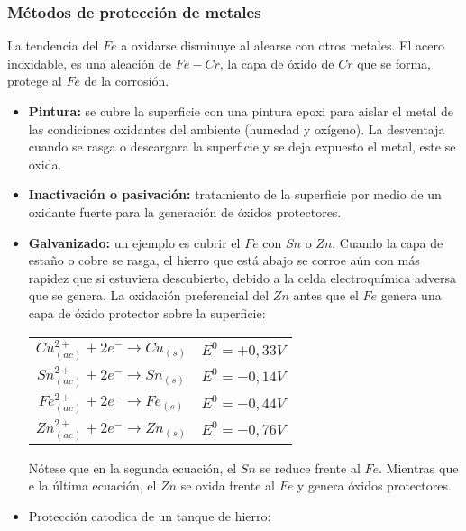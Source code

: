     \subsubsection{Métodos de protección de metales}
    \sangria{} La tendencia del $Fe$ a oxidarse disminuye al alearse con otros metales. El acero inoxidable, es una aleación de $Fe-Cr$, la capa de óxido de $Cr$ que se forma, protege al $Fe$ de la corrosión.
    \saltoPag{}
    \begin{itemize}
        \item \textbf{Pintura:} se cubre la superficie con una pintura epoxi para aislar el metal de las condiciones oxidantes del ambiente (humedad y oxígeno). La desventaja cuando se rasga o descargara la superficie y se deja expuesto el metal, este se oxida.
    \item \textbf{Inactivación o pasivación:} tratamiento de la superficie por medio de un oxidante fuerte para la generación de óxidos protectores.
    \item \textbf{Galvanizado:} un ejemplo es cubrir el $Fe$ con $Sn$ o $Zn$.
        \sangria{} Cuando la capa de estaño o cobre se rasga, el hierro que está abajo se corroe aún con más rapidez que si estuviera descubierto, debido a la celda electroquímica adversa que se genera. La oxidación preferencial del $Zn$ antes que el $Fe$ genera una capa de óxido protector sobre la superficie:
        \begin{center}
        \begin{tabular}{cc}
        \toprule
        \multicolumn{1}{c}{$Cu^{2+}_{(ac)} + 2e^- \rightarrow Cu_{(s)}$} &
        \multicolumn{1}{c}{$E^0 = +0,33V$} \\[5pt]
        \multicolumn{1}{c}{$Sn^{2+}_{(ac)} + 2e^- \rightarrow Sn_{(s)}$} &
        \multicolumn{1}{c}{$E^0 = -0,14V$} \\[5pt]
        \multicolumn{1}{c}{$Fe^{2+}_{(ac)} + 2e^- \rightarrow Fe_{(s)}$} &
        \multicolumn{1}{c}{$E^0 = -0,44V$} \\[5pt]
        \multicolumn{1}{c}{$Zn^{2+}_{(ac)} + 2e^- \rightarrow Zn_{(s)}$} &
        \multicolumn{1}{c}{$E^0 =-0,76V$} \\[5pt] \bottomrule
        \end{tabular}
        \end{center}
        Nótese que en la segunda ecuación, el $Sn$ se reduce frente al $Fe$. Mientras que e la última ecuación, el $Zn$ se oxida frente al $Fe$ y genera óxidos protectores.
    \item Protección catodica de un tanque de hierro:
    \end{itemize}

